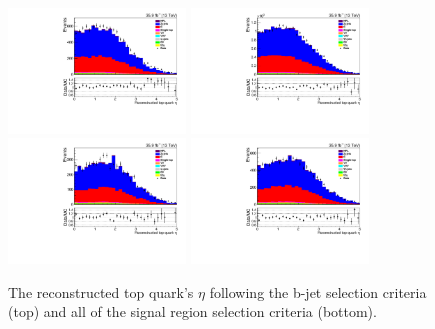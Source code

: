 \begin{figure}[ht]
\centering
\includegraphics[width=0.42\textwidth]{figs/background-estimation/plots/unblinded/prompt_ee_ttbarInc/topEta_NPL_ee_bTag_ee.pdf}
\includegraphics[width=0.42\textwidth]{figs/background-estimation/plots/unblinded/prompt_mumu_ttbarInc/topEta_NPL_mumu_bTag_mumu.pdf}
\\
\includegraphics[width=0.42\textwidth]{figs/background-estimation/plots/unblinded/prompt_ee_ttbarInc/topEta_NPL_ee_wMass_ee.pdf}
\includegraphics[width=0.42\textwidth]{figs/background-estimation/plots/unblinded/prompt_mumu_ttbarInc/topEta_NPL_mumu_wMass_mumu.pdf}
\caption{
The reconstructed top quark's $\eta$ following the b-jet selection criteria (top) and all of the signal region selection criteria (bottom).
}
\label{fig:App_SR_topEta}
\end{figure}

\clearpage
\newpage	

